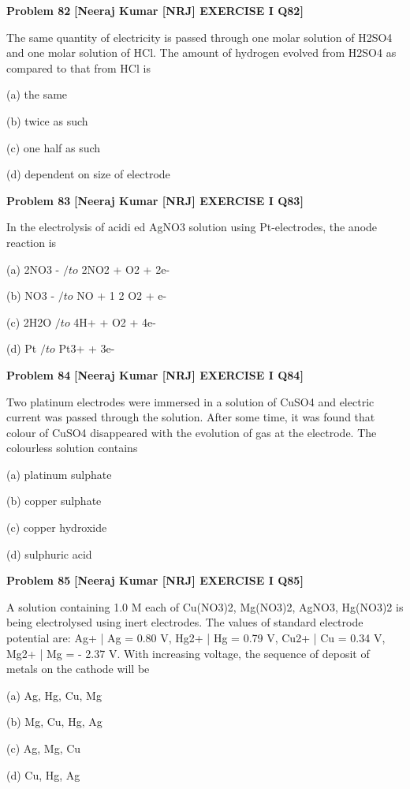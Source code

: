 \begin{problembox}
\textbf{Problem 82} \hfill \textbf{[Neeraj Kumar [NRJ] EXERCISE I Q82]}
\label{q:ext-nrj_all_questions-82}

The same quantity of electricity is passed through 
one molar solution of H2SO4 and one molar 
solution of HCl. The amount of hydrogen evolved 
from H2SO4 as compared to that from HCl is
 
 (a) the same
 
 (b) twice as such
 
 (c) one half as such
 
 (d) dependent on size of electrode
\end{problembox}

\begin{problembox}
\textbf{Problem 83} \hfill \textbf{[Neeraj Kumar [NRJ] EXERCISE I Q83]}
\label{q:ext-nrj_all_questions-83}

In the electrolysis of acidi  ed AgNO3 solution 
using Pt-electrodes, the anode reaction is
 
 (a) 2NO3
- $/to$ 2NO2 + O2 + 2e-
 
 (b) NO3
- $/to$ NO + 1
2 O2 + e-
 
 (c) 2H2O $/to$ 4H+ + O2 + 4e-
 
 (d) Pt $/to$ Pt3+ + 3e-
\end{problembox}

\begin{problembox}
\textbf{Problem 84} \hfill \textbf{[Neeraj Kumar [NRJ] EXERCISE I Q84]}
\label{q:ext-nrj_all_questions-84}

Two platinum electrodes were immersed in a 
solution of CuSO4 and electric current was passed 
through the solution. After some time, it was 
found that colour of CuSO4 disappeared with the 
evolution of gas at the electrode. The colourless 
solution contains
 
 (a) platinum sulphate
 
 (b) copper sulphate
 
 (c) copper hydroxide
 
 (d) sulphuric acid
\end{problembox}

\begin{problembox}
\textbf{Problem 85} \hfill \textbf{[Neeraj Kumar [NRJ] EXERCISE I Q85]}
\label{q:ext-nrj_all_questions-85}

A solution containing 1.0 M each of Cu(NO3)2, 
Mg(NO3)2, 
AgNO3, 
Hg(NO3)2 
is 
being 
electrolysed using inert electrodes. The values of 
standard electrode potential are: Ag+ | Ag = 0.80 V, 
Hg2+ | Hg  = 0.79 V, Cu2+ | Cu = 0.34 V, Mg2+ | Mg 
= - 2.37 V. With increasing voltage, the sequence 
of deposit of metals on the cathode will be
 
 (a) Ag, Hg, Cu, Mg 
 
 (b) Mg, Cu, Hg, Ag
 
 (c) Ag, Mg, Cu 
 
 (d) Cu, Hg, Ag
\end{problembox}

